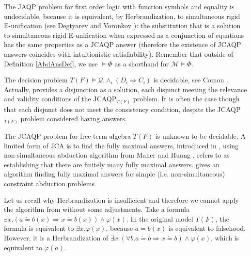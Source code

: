 \documentclass{article}
\newcommand{\tmrsub}[1]{\ensuremath{_{\textrm{#1}}}}
\begin{document}
The JAQP problem for first order logic with function symbols and equality is
undecidable, because it is equivalent, by Herbrandization, to simultaneous
rigid E-unification (see Degtyarev and Voronkov
{\cite{simulRigidEUnifUndec}}): the substitution that is a solution to
simultaneous rigid E-unification when expressed as a conjunction of equations
has the same properties as a JCAQP answer (therefore the existence of JCAQP
answers coincides with intuitionistic satisfiability). Remember that outside
of Definition \ref{AbdAnsDef}, we use $\vDash \Phi$ as a shorthand for
$\mathcal{M} \vDash \Phi$.

The decision problem $T (F) \vDash \mathcal{Q}. \wedge_i (D_i \Rightarrow
C_i)$ is decidable, see Comon {\cite{DisunificationComon}}. Actually,
{\cite{DisunificationComon}} provides a disjunction as a solution, each
disjunct meeting the relevance and validity conditions of the JCAQP\tmrsub{$T
(F)$} problem. It is often the case though that each disjunct does not meet
the consistency condition, despite the JCAQP\tmrsub{$T (F)$} problem
considered having answers.

The JCAQP problem for free term algebra $T (F)$ is unknown to be decidable. A
limited form of JCA is to find the fully maximal answers, introduced in
{\cite{AbductionMaher}}, using non-simultaneous abduction algorithm from Maher
and Huang {\cite{AbductionSolvMaher}}. {\cite{AbductionMaher}} refers to
{\cite{MaherParamSubstitutions}} as establishing that there are finitely many
fully maximal answers. {\cite{AbductionSolvMaher}} gives an algorithm finding
fully maximal answers for simple (i.e. non-simultaneous) constraint abduction
problems.

Let us recall why Herbrandization is insufficient and therefore we cannot
apply the algorithm from {\cite{AbductionSolvMaher}} without some adjustments.
Take a formula $\exists x. (a \dot{=} b (x) \Rightarrow x \dot{=} b (x))
\wedge \varphi (x)$. In the original model $T (F)$, the formula is equivalent
to $\exists x. \varphi (x)$, because $a \dot{=} b (x)$ is equivalent to
falsehood. However, it is a Herbrandization of $\exists x. (\forall b.a
\dot{=} b \Rightarrow x \dot{=} b) \wedge \varphi (x)$, which is equivalent to
$\varphi (a)$.
\end{document}
